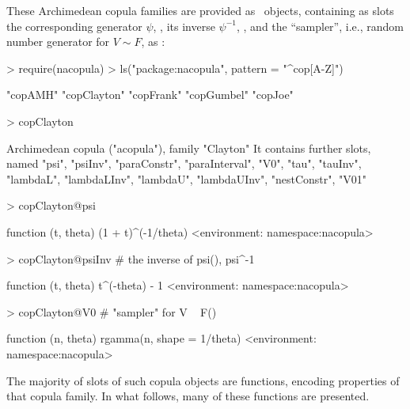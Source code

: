 \documentclass[nojss,article]{jss}
\theoremstyle{mythmstyle}
\newcommand*{\R}{\proglang{R}}%
\newcommand*{\psii}{{\psi^{-1}}}
\begin{document}
These Archimedean copula families are provided as  \R\
objects, containing as slots the corresponding generator
$\psi$, , its inverse $\psii$, ,
and the ``sampler'', i.e., random number generator for $V\sim F$, as :
\begin{Schunk}
\begin{Sinput}
> require(nacopula)
> ls("package:nacopula", pattern = "^cop[A-Z]")
\end{Sinput}
\begin{Soutput}
[1] "copAMH"     "copClayton" "copFrank"   "copGumbel"  "copJoe"    
\end{Soutput}
\begin{Sinput}
> copClayton
\end{Sinput}
\begin{Soutput}
Archimedean copula ("acopula"), family "Clayton"
 It contains further slots, named
  "psi", "psiInv", "paraConstr", "paraInterval", "V0", "tau",
  "tauInv", "lambdaL", "lambdaLInv", "lambdaU", "lambdaUInv",
  "nestConstr", "V01"
\end{Soutput}
\begin{Sinput}
> copClayton@psi
\end{Sinput}
\begin{Soutput}
function (t, theta) 
{
    (1 + t)^(-1/theta)
}
<environment: namespace:nacopula>
\end{Soutput}
\begin{Sinput}
> copClayton@psiInv # the inverse of psi(), psi^{-1}
\end{Sinput}
\begin{Soutput}
function (t, theta) 
{
    t^(-theta) - 1
}
<environment: namespace:nacopula>
\end{Soutput}
\begin{Sinput}
> copClayton@V0     # "sampler" for  V ~ F()
\end{Sinput}
\begin{Soutput}
function (n, theta) 
{
    rgamma(n, shape = 1/theta)
}
<environment: namespace:nacopula>
\end{Soutput}
\end{Schunk}
The majority of slots of such copula objects are functions, encoding properties
of that copula family. In what follows, many of these functions are presented.
\end{document}
